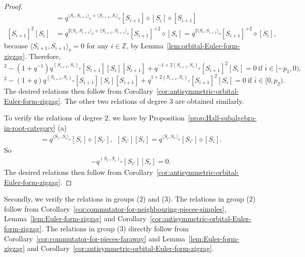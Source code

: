 \documentclass[reqno,12pt,a4paper]{amsart}
\theoremstyle{remark}
\theoremstyle{definition}
\numberwithin{equation}{section}
\begin{document}
\begin{proof}
\begin{align*}
  &=q^{\langle S_i,S_{i+1}\rangle_o+\langle S_{i+1},S_{i}\rangle_o}{[S_{i+1}]\diamond[S_i]\diamond[S_{i+1}]} \\
{[S_{i+1}]^2[S_i]} &= q^{2\langle S_{i}, S_{i+1}\rangle_o+\langle S_{i+1},S_{i
  	+1}\rangle_o}{[S_{i+1}]^{\diamond2}\diamond[S_i]}= q^{2\langle S_{i}, S_{i+1}\rangle_o}{[S_{i+1}]^{\diamond2}\diamond[S_i]},
\end{align*}
because $\langle S_{i+1},S_{i+1}\rangle_o=0$ for any $i\in\mathbb{Z}$, by Lemma~\ref{lem:orbital-Euler-form-zigzag}.
Therefore,
\begin{equation*}
[S_i][S_{i+1}]^{2}-(1+q^{-1})q^{(S_{i+1},S_i)_o}[S_{i+1}][S_i][S_{i+1}]+q^{-1+2(S_{i+1},S_i)_o}[S_{i+1}]^{2}[S_i]=0~\text{if }\overline{i}\in[-p_1,0),
\end{equation*}
 \begin{equation*}
[S_i][S_{i+1}]^{2}-(1+q)q^{(S_{i+1},S_i)_o}[S_{i+1}][S_i][S_{i+1}]+q^{1+2(S_{i+1},S_i)_o}[S_{i+1}]^{2}[S_i]=0~\text{if }\overline{i}\in[0,p_2).
\end{equation*}
The desired relations then follow from Corollary~\ref{cor:antisymmetric-orbital-Euler-form-zigzag}. The other two relations of degree $3$ are obtained similarly.

To verify the relations of degree $2$, we have by Proposition~\ref{prop:Hall-subalgebra-in-root-category} (a)
\begin{align*}
[S_i][S_{i'}]=q^{\langle S_{i'},S_i\rangle_o}[S_i]\diamond[S_{i'}],~~
[S_{i'}][S_i]=q^{\langle S_{i},S_{i'}\rangle_o}[S_{i'}]\diamond[S_{i}].
\end{align*}
So
\begin{align*}
[S_i][S_{i'}]-q^{(S_{i'},S_{i})_o}[S_{i'}][S_i]=0.
\end{align*}
The desired relations then follow from Corollary~\ref{cor:antisymmetric-orbital-Euler-form-zigzag}.
\end{proof}

Secondly, we verify the relations in groups (2) and (3). The relations in group (2) follow from Corollary~\ref{cor:commutator-for-neighbouring-pieces-simples}, Lemma~\ref{lem:Euler-form-zigzag} and Corollary~\ref{cor:antisymmetric-orbital-Euler-form-zigzag}. The relations in group (3) directly follow from Corollary~\ref{cor:commutator-for-pieces-faraway} and Lemma~\ref{lem:Euler-form-zigzag} and Corollary~\ref{cor:antisymmetric-orbital-Euler-form-zigzag}. 
\end{document}
